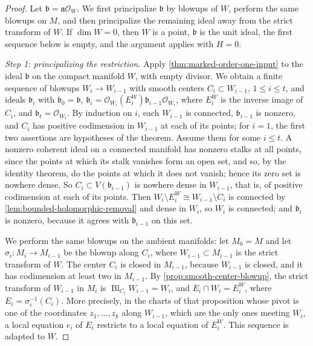 \begin{proof}
Let $\mathfrak b=\mathfrak a\mathcal O_W$. We first principalize $\mathfrak b$ by blowups of $W$, perform the same blowups on $M$, and then principalize the remaining ideal away from the strict transform of $W$. If $\dim W=0$, then $W$ is a point, $\mathfrak b$ is the unit ideal, the first sequence below is empty, and the argument applies with $H=0$.

\emph{Step 1: principalizing the restriction.} Apply \cref{thm:marked-order-one-input} to the ideal $\mathfrak b$ on the compact manifold $W$, with empty divisor. We obtain a finite sequence of blowups $W_i\to W_{i-1}$ with smooth centers $C_i\subset W_{i-1}$, $1\leq i\leq t$, and ideals $\mathfrak b_i$ with $\mathfrak b_0=\mathfrak b$, $\mathfrak b_i=\mathcal O_{W_i}(E^W_i)\mathfrak b_{i-1}\mathcal O_{W_i}$, where $E^W_i$ is the inverse image of $C_i$, and $\mathfrak b_t=\mathcal O_{W_t}$. By induction on $i$, each $W_{i-1}$ is connected, $\mathfrak b_{i-1}$ is nonzero, and $C_i$ has positive codimension in $W_{i-1}$ at each of its points; for $i=1$, the first two assertions are hypotheses of the theorem. Assume them for some $i\leq t$. A nonzero coherent ideal on a connected manifold has nonzero stalks at all points, since the points at which its stalk vanishes form an open set, and so, by the identity theorem, do the points at which it does not vanish; hence its zero set is nowhere dense. So $C_i\subset V(\mathfrak b_{i-1})$ is nowhere dense in $W_{i-1}$, that is, of positive codimension at each of its points. Then $W_i\setminus E^W_i\cong W_{i-1}\setminus C_i$ is connected by \cref{lem:bounded-holomorphic-removal} and dense in $W_i$, so $W_i$ is connected; and $\mathfrak b_i$ is nonzero, because it agrees with $\mathfrak b_{i-1}$ on this set.

We perform the same blowups on the ambient manifolds: let $M_0=M$ and let $\sigma_i\colon M_i\to M_{i-1}$ be the blowup along $C_i$, where $W_{i-1}\subset M_{i-1}$ is the strict transform of $W$. The center $C_i$ is closed in $M_{i-1}$, because $W_{i-1}$ is closed, and it has codimension at least two in $M_{i-1}$. By \cref{prop:smooth-center-blowup}, the strict transform of $W_{i-1}$ in $M_i$ is $\operatorname{Bl}_{C_i}W_{i-1}=W_i$, and $E_i\cap W_i=E^W_i$, where $E_i=\sigma_i^{-1}(C_i)$. More precisely, in the charts of that proposition whose pivot is one of the coordinates $z_1,\ldots,z_k$ along $W_{i-1}$, which are the only ones meeting $W_i$, a local equation $e_i$ of $E_i$ restricts to a local equation of $E^W_i$. This sequence is adapted to $W$.


\end{proof}
